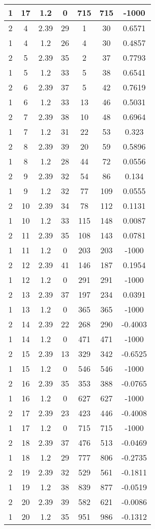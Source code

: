 \documentclass[letterpaper, 12pt]{article}
\begin{document}
\begin{longtable}{|c|c|c|c|c|c|c|}
\hline
1 & 17 & 1.2 & 0 & 715 & 715 & -1000 \\
\hline
2 & 4 & 2.39 & 29 & 1 & 30 & 0.6571 \\
\hline
1 & 4 & 1.2 & 26 & 4 & 30 & 0.4857 \\
\hline
2 & 5 & 2.39 & 35 & 2 & 37 & 0.7793 \\
\hline
1 & 5 & 1.2 & 33 & 5 & 38 & 0.6541 \\
\hline
2 & 6 & 2.39 & 37 & 5 & 42 & 0.7619 \\
\hline
1 & 6 & 1.2 & 33 & 13 & 46 & 0.5031 \\
\hline
2 & 7 & 2.39 & 38 & 10 & 48 & 0.6964 \\
\hline
1 & 7 & 1.2 & 31 & 22 & 53 & 0.323 \\
\hline
2 & 8 & 2.39 & 39 & 20 & 59 & 0.5896 \\
\hline
1 & 8 & 1.2 & 28 & 44 & 72 & 0.0556 \\
\hline
2 & 9 & 2.39 & 32 & 54 & 86 & 0.134 \\
\hline
1 & 9 & 1.2 & 32 & 77 & 109 & 0.0555 \\
\hline
2 & 10 & 2.39 & 34 & 78 & 112 & 0.1131 \\
\hline
1 & 10 & 1.2 & 33 & 115 & 148 & 0.0087 \\
\hline
2 & 11 & 2.39 & 35 & 108 & 143 & 0.0781 \\
\hline
1 & 11 & 1.2 & 0 & 203 & 203 & -1000 \\
\hline
2 & 12 & 2.39 & 41 & 146 & 187 & 0.1954 \\
\hline
1 & 12 & 1.2 & 0 & 291 & 291 & -1000 \\
\hline
2 & 13 & 2.39 & 37 & 197 & 234 & 0.0391 \\
\hline
1 & 13 & 1.2 & 0 & 365 & 365 & -1000 \\
\hline
2 & 14 & 2.39 & 22 & 268 & 290 & -0.4003 \\
\hline
1 & 14 & 1.2 & 0 & 471 & 471 & -1000 \\
\hline
2 & 15 & 2.39 & 13 & 329 & 342 & -0.6525 \\
\hline
1 & 15 & 1.2 & 0 & 546 & 546 & -1000 \\
\hline
2 & 16 & 2.39 & 35 & 353 & 388 & -0.0765 \\
\hline
1 & 16 & 1.2 & 0 & 627 & 627 & -1000 \\
\hline
2 & 17 & 2.39 & 23 & 423 & 446 & -0.4008 \\
\hline
1 & 17 & 1.2 & 0 & 715 & 715 & -1000 \\
\hline
2 & 18 & 2.39 & 37 & 476 & 513 & -0.0469 \\
\hline
1 & 18 & 1.2 & 29 & 777 & 806 & -0.2735 \\
\hline
2 & 19 & 2.39 & 32 & 529 & 561 & -0.1811 \\
\hline
1 & 19 & 1.2 & 38 & 839 & 877 & -0.0519 \\
\hline
2 & 20 & 2.39 & 39 & 582 & 621 & -0.0086 \\
\hline
1 & 20 & 1.2 & 35 & 951 & 986 & -0.1312 \\
\hline
\end{longtable}
\end{document}
